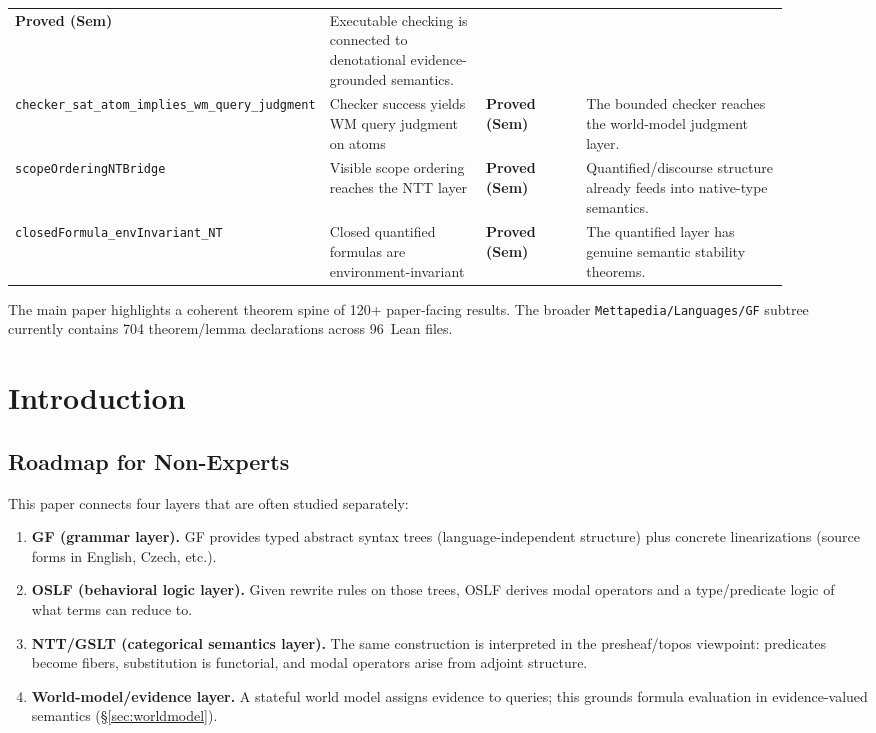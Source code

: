 \documentclass[11pt]{article}
\newcommand{\code}[1]{\texttt{#1}}
\newcommand{\OSLF}{\textup{OSLF}}
\newcommand{\GF}{\textup{GF}}
\newcommand{\NTT}{\textup{NTT}}
\begin{document}
\begin{center}
\begin{tabular}{@{}p{0.26\linewidth}p{0.22\linewidth}p{0.14\linewidth}p{0.28\linewidth}@{}}
\textbf{Proved (Sem)} &
Executable checking is connected to denotational evidence-grounded semantics. \\
\code{checker\_sat\_atom\_implies\_wm\_query\_judgment} &
Checker success yields WM query judgment on atoms &
\textbf{Proved (Sem)} &
The bounded checker reaches the world-model judgment layer. \\
\code{scopeOrderingNTBridge} &
Visible scope ordering reaches the \NTT{} layer &
\textbf{Proved (Sem)} &
Quantified/discourse structure already feeds into native-type semantics. \\
\code{closedFormula\_envInvariant\_NT} &
Closed quantified formulas are environment-invariant &
\textbf{Proved (Sem)} &
The quantified layer has genuine semantic stability theorems. \\
\bottomrule
\end{tabular}
\end{center}
\noindent
The main paper highlights a coherent theorem spine of 120+ paper-facing results.
The broader \code{Mettapedia/Languages/GF} subtree currently contains 704
theorem/lemma declarations across 96~Lean files.

\tableofcontents

\section{Introduction}
\label{sec:intro}

\subsection{Roadmap for Non-Experts}

This paper connects four layers that are often studied separately:

\begin{enumerate}
\item \textbf{\GF{} (grammar layer).}  \GF{} provides typed abstract syntax trees
  (language-independent structure) plus concrete linearizations (source forms
  in English, Czech, etc.).
\item \textbf{\OSLF{} (behavioral logic layer).}  Given rewrite rules on those
  trees, \OSLF{} derives modal operators and a type/predicate logic of what
  terms can reduce to.
\item \textbf{\NTT{}/GSLT (categorical semantics layer).}  The same construction
  is interpreted in the presheaf/topos viewpoint: predicates become fibers,
  substitution is functorial, and modal operators arise from adjoint structure.
\item \textbf{World-model/evidence layer.}  A stateful world model assigns
  evidence to queries; this grounds formula evaluation in evidence-valued
  semantics (\S\ref{sec:worldmodel}).
\end{enumerate}
\end{document}
